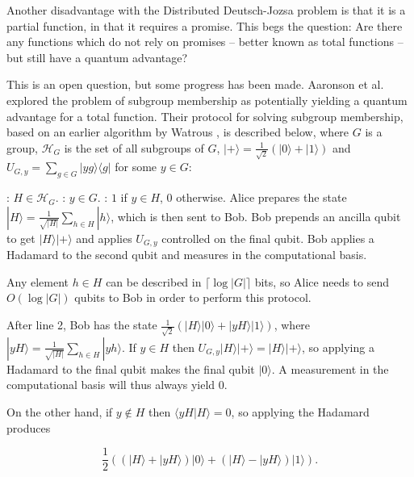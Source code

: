 \documentclass[a4paper]{article}
\begin{document}
        Another disadvantage with the Distributed Deutsch-Jozsa problem is that it is a partial function, in that it requires a promise. This begs the question: Are there any functions which do not rely on promises -- better known as total functions -- but still have a quantum advantage?

        This is an open question, but some progress has been made. Aaronson et al.~\cite{0902.3175} explored the problem of subgroup membership as potentially yielding a quantum advantage for a total function. Their protocol for solving subgroup membership, based on an earlier algorithm by Watrous \cite{Watrous:2000:SQP:795666.796590}, is described below, where $G$ is a group, $\mathscr{H}_G$ is the set of all subgroups of $G$, $|+\rangle = \frac{1}{\sqrt{2}}(|0\rangle + |1\rangle)$ and $U_{G, y} = \sum_{g \in G}|yg\rangle\langle g|$ for some $y \in G$:

        \begin{codebox}
            \zi {}: $H \in \mathscr{H}_G$.
            \zi {}: $y \in G$.
            \zi {}: $1$ if $y \in H$, $0$ otherwise.
            \li Alice prepares the state $|H\rangle = \frac{1}{\sqrt{|H|}}\sum_{h \in H}|h\rangle$, which is then sent to Bob.
            \li Bob prepends an ancilla qubit to get $|H\rangle|+\rangle$ and applies $U_{G, y}$ controlled on the final qubit.
            \li Bob applies a Hadamard to the second qubit and measures in the computational basis.
        \end{codebox}

        Any element $h \in H$ can be described in $\lceil\log |G|\rceil$ bits, so Alice needs to send $O(\log |G|)$ qubits to Bob in order to perform this protocol.

        After line 2, Bob has the state $\frac{1}{\sqrt{2}}(|H\rangle|0\rangle + |yH\rangle|1\rangle)$, where $|yH\rangle = \frac{1}{\sqrt{|H|}}\sum_{h \in H}|yh\rangle$. If $y \in H$ then $U_{G, y}|H\rangle|+\rangle = |H\rangle|+\rangle$, so applying a Hadamard to the final qubit makes the final qubit $|0\rangle$. A measurement in the computational basis will thus always yield $0$.

        On the other hand, if $y \notin H$ then $\langle yH|H\rangle = 0$, so applying the Hadamard produces

        $$\frac{1}{2}((|H\rangle + |yH\rangle)|0\rangle + (|H\rangle - |yH\rangle)|1\rangle).$$
\end{document}
